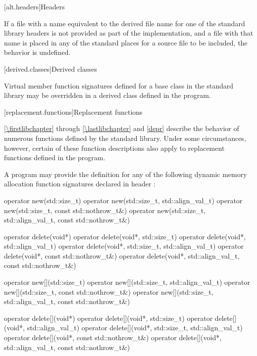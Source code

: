 [alt.headers]{Headers}

\pnum
If a file with a name
equivalent to the derived file name for one of the \Cpp{} standard library headers
is not provided as part of the implementation, and a file with that name
is placed in any of the standard places for a source file to be included,
the behavior is undefined.%
%

[derived.classes]{Derived classes}

\pnum
Virtual member function signatures defined
%
for a base class in the \Cpp{} standard
%
%
library may be overridden in a derived class defined in the program.

[replacement.functions]{Replacement functions}

\pnum
{}%
\ref{\firstlibchapter} through \ref{\lastlibchapter} and \ref{depr}
describe the behavior of numerous functions defined by
the \Cpp{} standard library.
Under some circumstances,
%
however, certain of these function descriptions also apply to replacement functions defined
in the program.

\pnum
A \Cpp{} program may provide the definition for any of the following
dynamic memory allocation function signatures declared in header
:

%
%
\begin{codeblock}
operator new(std::size_t)
operator new(std::size_t, std::align_val_t)
operator new(std::size_t, const std::nothrow_t&)
operator new(std::size_t, std::align_val_t, const std::nothrow_t&)
\end{codeblock}%
%
%
\begin{codeblock}
operator delete(void*)
operator delete(void*, std::size_t)
operator delete(void*, std::align_val_t)
operator delete(void*, std::size_t, std::align_val_t)
operator delete(void*, const std::nothrow_t&)
operator delete(void*, std::align_val_t, const std::nothrow_t&)
\end{codeblock}%
%
%
\begin{codeblock}
operator new[](std::size_t)
operator new[](std::size_t, std::align_val_t)
operator new[](std::size_t, const std::nothrow_t&)
operator new[](std::size_t, std::align_val_t, const std::nothrow_t&)
\end{codeblock}%
%
%
\begin{codeblock}
operator delete[](void*)
operator delete[](void*, std::size_t)
operator delete[](void*, std::align_val_t)
operator delete[](void*, std::size_t, std::align_val_t)
operator delete[](void*, const std::nothrow_t&)
operator delete[](void*, std::align_val_t, const std::nothrow_t&)
\end{codeblock}

